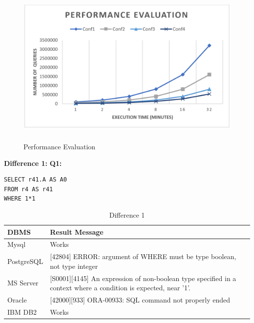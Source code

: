  \begin{figure}        
      \includegraphics[width=\textwidth,height=8cm,width=10cm]{Images/performance_evaluation}
      \caption{Performance Evaluation}
      \label{fig:Performance Evaluation}
 \end{figure}

\hfill\newline\textbf{Difference 1:}
\hfill\newline\textbf{Q1:}
\begin{mdframed}[nobreak=true, backgroundcolor=lightgray!20] 
\begin{lstlisting}[style=SQL]
SELECT r41.A AS A0
FROM r4 AS r41
WHERE 1*1
\end{lstlisting}
\end{mdframed}

\begin{table}[h]
\centering
\caption{Difference 1}
\begin{tabular}{|p{2cm}|p{11.5cm}| }
\hline
\textbf{DBMS} & \textbf{Result Message}                                                                                                 \\ \hline
Mysql         & Works                                                                                                                   \\ \hline
PostgreSQL    & {[}42804{]} ERROR: argument of WHERE must be type boolean, not type integer                                             \\ \hline
MS Server     & {[}S0001{]}{[}4145{]} An expression of non-boolean type specified in a context where a condition is expected, near '1'. \\ \hline
Oracle        & {[}42000{]}{[}933{]} ORA-00933: SQL command not properly ended                                                          \\ \hline
IBM DB2       & Works                                                                                                                   \\ \hline
\end{tabular}
\end{table}

